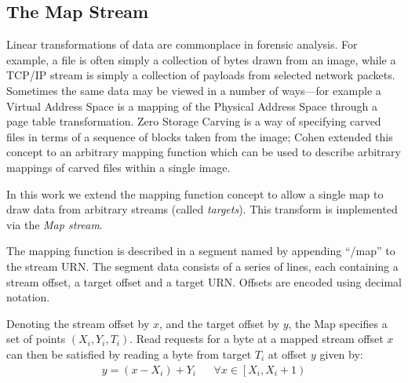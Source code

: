 \documentclass[10pt, conference]{IEEEtran}
\begin{document}
{{%


\subsection{The Map Stream}
\label{map_stream}
Linear transformations of data are commonplace in forensic
analysis. For example, a file is often simply a collection of bytes
drawn from an image, while a TCP/IP stream is simply a collection of
payloads from selected network packets. Sometimes the same data may be
viewed in a number of ways---for example a Virtual Address Space is a
mapping of the Physical Address Space through a page table
transformation.  Zero Storage Carving\cite{Meijer2006} is a way of
specifying carved files in terms of a sequence of blocks taken from
the image; Cohen extended this concept to an arbitrary mapping
function\cite{1363239,Cohen2007} which can be used to describe
arbitrary mappings of carved files within a single image.

In this work we extend the mapping function concept to allow a single
map to draw data from arbitrary streams (called {\em targets}). This
transform is implemented via the {\em Map stream}.

The mapping function is described in a segment named by appending
``/map'' to the stream URN. The segment data consists of a series of
lines, each containing a stream offset, a target offset and a target
URN. Offsets are encoded using decimal notation.

Denoting the stream offset by $x$, and the target offset by $y$, the
Map specifies a set of points $(X_i,Y_i,T_i)$. Read requests for a
byte at a mapped stream offset $x$ can then be satisfied by reading a
byte from target $T_i$ at offset $y$ given by:
\begin{eqnarray}
y = (x - X_i) + Y_i & &
\forall x \in \left [X_i, X_i+1 \right )
\end{eqnarray}

}}
\end{document}
